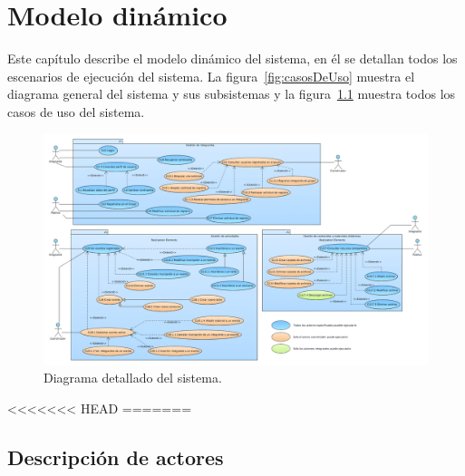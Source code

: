 \chapter{Modelo dinámico}	
\label{cap:modDinamico}

	Este capítulo describe el modelo dinámico del sistema, en él se detallan todos los escenarios de ejecución del sistema. La figura~\ref{fig:casosDeUso} muestra el diagrama general del sistema y sus subsistemas y la figura~\ref{fig:casosDeUsoDetalle} muestra todos los casos de uso del sistema. 
	
\begin{figure}[htbp]
	\begin{center}
		\includegraphics[angle=90,width=.7\textwidth]{images/casosDeUsoDetalle}
		\caption{Diagrama detallado del sistema.}
		\label{fig:casosDeUsoDetalle}
	\end{center}
\end{figure}

<<<<<<< HEAD
=======
\section{Descripción de actores}

